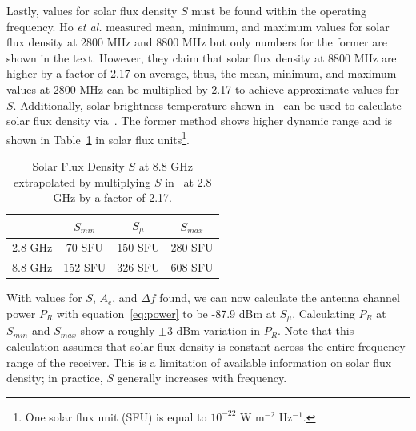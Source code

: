 \documentclass[titlepage]{article}
\begin{document}
Lastly, values for solar flux density $S$ must be found within the operating frequency. Ho \textit{et al.}\cite{solartemp} measured mean, minimum, and maximum values for solar flux density at 2800 MHz and 8800 MHz but only numbers for the former are shown in the text. However, they claim that solar flux density at 8800 MHz are higher by a factor of 2.17 on average, thus, the mean, minimum, and maximum values at 2800 MHz can be multiplied by 2.17 to achieve approximate values for $S$. Additionally, solar brightness temperature shown in~\cite[Fig.~5]{solartemp} can be used to calculate solar flux density via~\cite[eq.~(2)]{solartemp}. The former method shows higher dynamic range and is shown in Table~\ref{tab:sfd} in solar flux units\footnote{One solar flux unit (SFU) is equal to $10^{-22}$ W m$^{-2}$ Hz$^{-1}$.}.
\begin{table}[!ht]
\centering
\begin{tabular}{c|c|c|c}
    & $S_{min}$ & $S_{\mu}$ & $S_{max}$ \\ \hline
    2.8 GHz & 70 SFU & 150 SFU & 280 SFU \\
    8.8 GHz & 152 SFU & 326 SFU & 608 SFU
\end{tabular}
\label{tab:sfd}
\caption{Solar Flux Density $S$ at 8.8 GHz extrapolated by multiplying $S$ in~\cite{solartemp} at 2.8 GHz by a factor of 2.17.}
\end{table}

With values for $S$, $A_e$, and $\Delta f$ found, we can now calculate the antenna channel power $P_R$ with equation~\ref{eq:power} to be -87.9 dBm at $S_{\mu}$. Calculating $P_R$ at $S_{min}$ and $S_{max}$ show a roughly $\pm$3 dBm variation in $P_R$. Note that this calculation assumes that solar flux density is constant across the entire frequency range of the receiver. This is a limitation of available information on solar flux density; in practice, $S$ generally increases with frequency\cite{sfd1986}.
\end{document}
